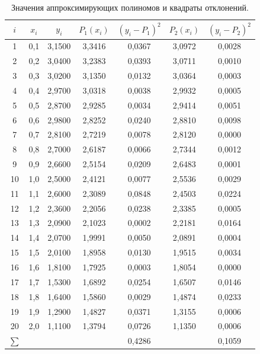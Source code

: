 \documentclass[a4paper, final]{article}
\begin{document}
\begin{table}[h!]
\centering
\small
\begin{tabular}{|c|c|c|c|c|c|c|}
\hline
$i$ & $x_i$ & $y_i$ & $P_1(x_i)$ & $(y_i - P_1)^2$ & $P_2(x_i)$ & $(y_i - P_2)^2$ \\
\hline
1  & 0,1 & 3,1500 & 3,3416 & 0,0367 & 3,0972 & 0,0028 \\
2  & 0,2 & 3,0400 & 3,2383 & 0,0393 & 3,0711 & 0,0010 \\
3  & 0,3 & 3,0200 & 3,1350 & 0,0132 & 3,0364 & 0,0003 \\
4  & 0,4 & 2,9700 & 3,0318 & 0,0038 & 2,9932 & 0,0005 \\
5  & 0,5 & 2,8700 & 2,9285 & 0,0034 & 2,9414 & 0,0051 \\
6  & 0,6 & 2,9800 & 2,8252 & 0,0240 & 2,8810 & 0,0098 \\
7  & 0,7 & 2,8100 & 2,7219 & 0,0078 & 2,8120 & 0,0000 \\
8  & 0,8 & 2,7000 & 2,6187 & 0,0066 & 2,7344 & 0,0012 \\
9  & 0,9 & 2,6600 & 2,5154 & 0,0209 & 2,6483 & 0,0001 \\
10 & 1,0 & 2,5000 & 2,4121 & 0,0077 & 2,5536 & 0,0029 \\
11 & 1,1 & 2,6000 & 2,3089 & 0,0848 & 2,4503 & 0,0224 \\
12 & 1,2 & 2,3600 & 2,2056 & 0,0238 & 2,3385 & 0,0005 \\
13 & 1,3 & 2,0900 & 2,1023 & 0,0002 & 2,2181 & 0,0164 \\
14 & 1,4 & 2,0700 & 1,9991 & 0,0050 & 2,0891 & 0,0004 \\
15 & 1,5 & 2,0100 & 1,8958 & 0,0130 & 1,9515 & 0,0034 \\
16 & 1,6 & 1,8100 & 1,7925 & 0,0003 & 1,8054 & 0,0000 \\
17 & 1,7 & 1,5300 & 1,6892 & 0,0254 & 1,6507 & 0,0146 \\
18 & 1,8 & 1,6400 & 1,5860 & 0,0029 & 1,4874 & 0,0233 \\
19 & 1,9 & 1,2900 & 1,4827 & 0,0371 & 1,3155 & 0,0006 \\
20 & 2,0 & 1,1100 & 1,3794 & 0,0726 & 1,1350 & 0,0006 \\
\hline
$\sum$ & & & & 0,4286 & & 0,1059 \\
\hline
\end{tabular}
\caption{Значения аппроксимирующих полиномов и квадраты отклонений.}
\label{tab:dev}
\end{table}

\newpage
\end{document}
